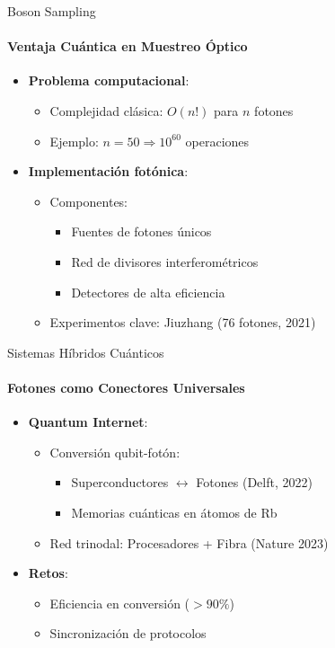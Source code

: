 \documentclass{beamer}
\begin{document}
\begin{frame}{Boson Sampling}
\framesubtitle{Ventaja Cuántica en Muestreo Óptico}

\begin{itemize}
    \item \textbf{Problema computacional}:
    \begin{itemize}
        \item Complejidad clásica: $O(n!)$ para $n$ fotones
        \item Ejemplo: $n=50 \Rightarrow 10^{60}$ operaciones
    \end{itemize}
    
    \item \textbf{Implementación fotónica}:
    \begin{itemize}
        \item Componentes:
        \begin{itemize}
            \item Fuentes de fotones únicos
            \item Red de divisores interferométricos
            \item Detectores de alta eficiencia
        \end{itemize}
        \item Experimentos clave: Jiuzhang (76 fotones, 2021)
    \end{itemize}
\end{itemize}
\end{frame}

\begin{frame}{Sistemas Híbridos Cuánticos}
\framesubtitle{Fotones como Conectores Universales}

\begin{itemize}
    \item \textbf{Quantum Internet}:
    \begin{itemize}
        \item Conversión qubit-fotón:
        \begin{itemize}
            \item Superconductores $\leftrightarrow$ Fotones (Delft, 2022)
            \item Memorias cuánticas en átomos de Rb
        \end{itemize}
        \item Red trinodal: Procesadores + Fibra (Nature 2023)
    \end{itemize}
    
    \item \textbf{Retos}:
    \begin{itemize}
        \item Eficiencia en conversión ($>90\%$)
        \item Sincronización de protocolos
    \end{itemize}
\end{itemize}
\end{frame}
\end{document}
